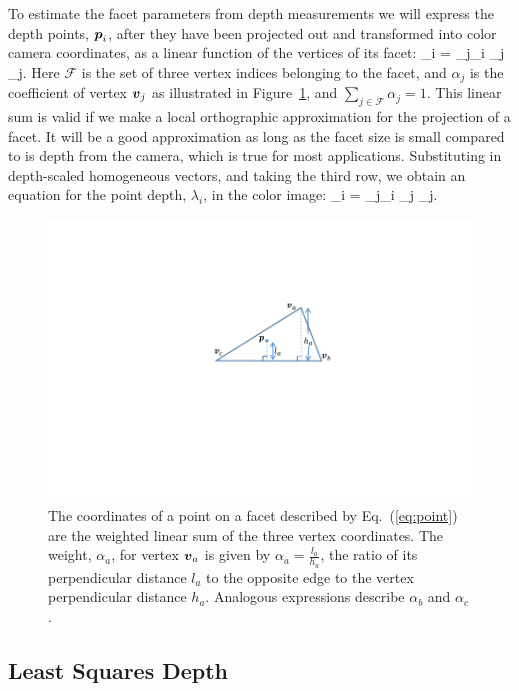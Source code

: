 To estimate the facet parameters from depth measurements we will express the depth points, $\boldsymbol{p}_i$, after they have been projected out and transformed into color camera coordinates, as a linear function of the vertices of its facet:
\beq  %
\point_i = \sum_{j\in{}_i} \alpha_j \vertex_j. \label{eq:point}
\eeq
Here $\mathcal{F}$ is the set of three vertex indices belonging to the facet, and $\alpha_j$ is the coefficient of vertex $\boldsymbol{v}_j$ as illustrated in Figure~\ref{fig:triangle}, and $\sum_{j\in\mathcal{F}}\alpha_j=1$.  This linear sum is valid if we make a local orthographic approximation for the projection of a facet.  It will be a good approximation as long as the facet size is small compared to is depth from the camera, which is true for most applications.  Substituting in depth-scaled homogeneous vectors, and taking the third row, we obtain an equation for the point depth, $\lambda_i$, in the color image:
\beq
\lambda_i = \sum_{j\in{}_i} \alpha_j \lambda_j. \label{eq:pointdepth}
\eeq

\begin{figure}
\begin{center}
   \includegraphics[trim=150 140 140 80,clip,width=0.5\linewidth]{Figures/TriangleParameterization}
\end{center}
   \caption{The coordinates of a point on a facet described by Eq.~(\ref{eq:point}) are the weighted linear sum of the three vertex coordinates.  The weight, $\alpha_a$, for vertex $\boldsymbol{v}_a$ is given by $\alpha_a = \frac{l_a}{h_a}$, the ratio of its perpendicular distance $l_a$ to the opposite edge to the vertex perpendicular distance $h_a$.  Analogous expressions describe $\alpha_b$ and $\alpha_c$. }
\label{fig:triangle}
\end{figure}

\subsection{Least Squares Depth}

